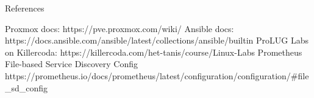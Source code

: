 \documentclass[14pt,compress,usenames,dvipsnames,aspectratio=169]{beamer}
\begin{document}
\begin{frame}{References}
    
        Proxmox docs: https://pve.proxmox.com/wiki/  
        Ansible docs: https://docs.ansible.com/ansible/latest/collections/ansible/builtin  
        ProLUG Labs on Killercoda: https://killercoda.com/het-tanis/course/Linux-Labs  
        Prometheus File-based Service Discovery Config https://prometheus.io/docs/prometheus/latest/configuration/configuration/#file_sd_config  
    
\end{frame}
\end{document}
